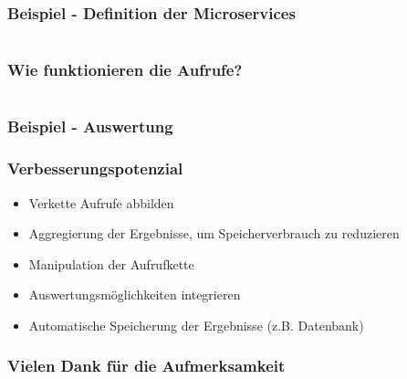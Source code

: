 \begin{frame}
    \frametitle{Beispiel - Definition der Microservices}
    \inputminted{csharp}{code/Beispiel.cs}
\end{frame}

\begin{frame}
    \frametitle{Wie funktionieren die Aufrufe?}
    \inputminted{csharp}{code/CallChain.cs}

    
\end{frame}

\begin{frame}
    \frametitle{Beispiel - Auswertung}
\end{frame}


\begin{frame}
    \frametitle{Verbesserungspotenzial}
    \begin{itemize}
        \item Verkette Aufrufe abbilden
        \item Aggregierung der Ergebnisse, um Speicherverbrauch zu reduzieren
        \item Manipulation der Aufrufkette
        \item Auswertungsmöglichkeiten integrieren
        \item Automatische Speicherung der Ergebnisse (z.B. Datenbank)
    \end{itemize}
\end{frame}


\begin{frame}
    \frametitle{Vielen Dank für die Aufmerksamkeit}
\end{frame}